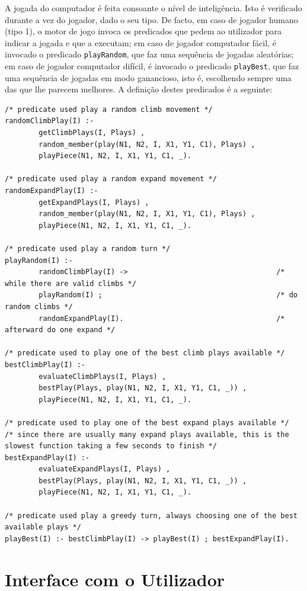 \documentclass[a4paper]{article}
\begin{document}
A jogada do computador é feita consoante o nível de inteligência. Isto é verificado durante a vez do jogador, dado o seu tipo. De facto, em caso de jogador humano (tipo 1), o motor de jogo invoca os predicados que pedem ao utilizador para indicar a jogada e que a executam; em caso de jogador computador fácil, é invocado o predicado \verb|playRandom|, que faz uma sequência de jogadas aleatórias; em caso de jogador computador difícil, é invocado o predicado \verb|playBest|, que faz uma sequência de jogadas em modo ganancioso, isto é, escolhendo sempre uma das que lhe parecem melhores. A definição destes predicados é a seguinte:

\begin{lstlisting}
/* predicate used play a random climb movement */
randomClimbPlay(I) :- 
        getClimbPlays(I, Plays) , 
        random_member(play(N1, N2, I, X1, Y1, C1), Plays) , 
        playPiece(N1, N2, I, X1, Y1, C1, _).

/* predicate used play a random expand movement */
randomExpandPlay(I) :- 
        getExpandPlays(I, Plays) , 
        random_member(play(N1, N2, I, X1, Y1, C1), Plays) , 
        playPiece(N1, N2, I, X1, Y1, C1, _).

/* predicate used play a random turn */
playRandom(I) :- 
        randomClimbPlay(I) ->                                   /* while there are valid climbs */
        playRandom(I) ;                                         /* do random climbs */
        randomExpandPlay(I).                                    /* afterward do one expand */

/* predicate used to play one of the best climb plays available */
bestClimbPlay(I) :- 
        evaluateClimbPlays(I, Plays) , 
        bestPlay(Plays, play(N1, N2, I, X1, Y1, C1, _)) , 
        playPiece(N1, N2, I, X1, Y1, C1, _).

/* predicate used to play one of the best expand plays available */
/* since there are usually many expand plays available, this is the slowest function taking a few seconds to finish */
bestExpandPlay(I) :- 
        evaluateExpandPlays(I, Plays) , 
        bestPlay(Plays, play(N1, N2, I, X1, Y1, C1, _)) , 
        playPiece(N1, N2, I, X1, Y1, C1, _).

/* predicate used play a greedy turn, always choosing one of the best available plays */
playBest(I) :- bestClimbPlay(I) -> playBest(I) ; bestExpandPlay(I).
\end{lstlisting}

\section{Interface com o Utilizador}
\end{document}
